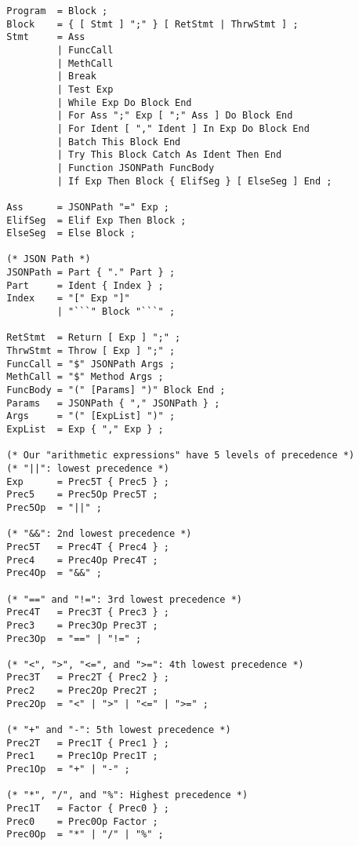 \begin{center}
    \begin{verbatim}
        Program  = Block ;
        Block    = { [ Stmt ] ";" } [ RetStmt | ThrwStmt ] ;
        Stmt     = Ass
                 | FuncCall
                 | MethCall
                 | Break
                 | Test Exp
                 | While Exp Do Block End
                 | For Ass ";" Exp [ ";" Ass ] Do Block End
                 | For Ident [ "," Ident ] In Exp Do Block End
                 | Batch This Block End
                 | Try This Block Catch As Ident Then End
                 | Function JSONPath FuncBody
                 | If Exp Then Block { ElifSeg } [ ElseSeg ] End ;

        Ass      = JSONPath "=" Exp ;
        ElifSeg  = Elif Exp Then Block ;
        ElseSeg  = Else Block ;

        (* JSON Path *)
        JSONPath = Part { "." Part } ;
        Part     = Ident { Index } ;
        Index    = "[" Exp "]"
                 | "```" Block "```" ;

        RetStmt  = Return [ Exp ] ";" ;
        ThrwStmt = Throw [ Exp ] ";" ;
        FuncCall = "$" JSONPath Args ;
        MethCall = "$" Method Args ;
        FuncBody = "(" [Params] ")" Block End ;
        Params   = JSONPath { "," JSONPath } ;
        Args     = "(" [ExpList] ")" ;
        ExpList  = Exp { "," Exp } ;

        (* Our "arithmetic expressions" have 5 levels of precedence *)
        (* "||": lowest precedence *)
        Exp      = Prec5T { Prec5 } ;
        Prec5    = Prec5Op Prec5T ;
        Prec5Op  = "||" ;

        (* "&&": 2nd lowest precedence *)
        Prec5T   = Prec4T { Prec4 } ;
        Prec4    = Prec4Op Prec4T ;
        Prec4Op  = "&&" ;

        (* "==" and "!=": 3rd lowest precedence *)
        Prec4T   = Prec3T { Prec3 } ;
        Prec3    = Prec3Op Prec3T ;
        Prec3Op  = "==" | "!=" ;

        (* "<", ">", "<=", and ">=": 4th lowest precedence *)
        Prec3T   = Prec2T { Prec2 } ;
        Prec2    = Prec2Op Prec2T ;
        Prec2Op  = "<" | ">" | "<=" | ">=" ;

        (* "+" and "-": 5th lowest precedence *)
        Prec2T   = Prec1T { Prec1 } ;
        Prec1    = Prec1Op Prec1T ;
        Prec1Op  = "+" | "-" ;

        (* "*", "/", and "%": Highest precedence *)
        Prec1T   = Factor { Prec0 } ;
        Prec0    = Prec0Op Factor ;
        Prec0Op  = "*" | "/" | "%" ;


\end{verbatim}
\end{center}
